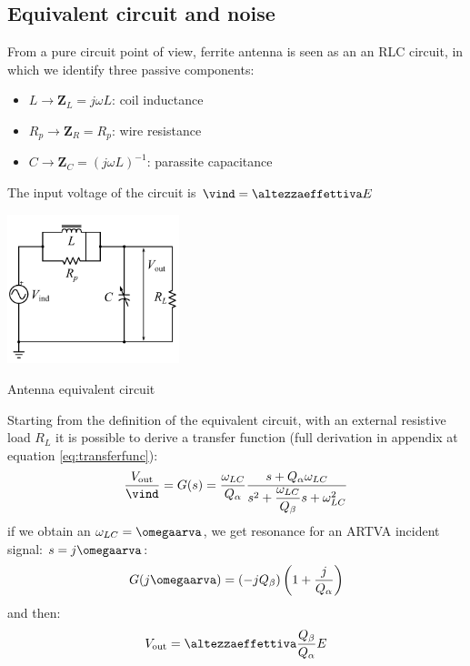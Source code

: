 \subsection{Equivalent circuit and noise}
From a pure circuit point of view, ferrite antenna is seen as an an RLC circuit, in which we identify three passive components:
\begin{itemize}
\item $L\rightarrow\mathbf{Z}_L = j\omega L$: coil inductance
\item $R_p\rightarrow\mathbf{Z}_R = R_p$: wire resistance
\item $C\rightarrow\mathbf{Z}_C = (j\omega L)^{-1}$: parassite capacitance
\end{itemize}
The input voltage of the circuit is $\vind=\altezzaeffettiva E$
\begin{marginfigure}
	\centering
	\includegraphics[width=5cm]{ch2/img/circuito_eq.pdf}
	\caption{Antenna equivalent circuit}
\end{marginfigure}

Starting from the definition of the equivalent circuit, with an external resistive load $R_L$ it is possible to derive a transfer function (full derivation in appendix at equation \ref{eq:transferfunc}):
\begin{equation}
\dfrac{V_{\mathrm{out}}}{\vind} = G(s) = \dfrac{\omega_{LC}}{Q_{\alpha}} \dfrac{s + Q_{\alpha} \omega_{LC}}{s^2 + \dfrac{\omega_{LC}}{Q_{\beta}} s + \omega_{LC}^2}
\end{equation}
if we obtain an ${\omega_{LC} = \omegaarva}$, we get resonance for an ARTVA incident signal: ${s=j\omegaarva}$:
\begin{equation}
G(j\omegaarva) = \left( -j Q_{\beta} \right) \left( 1 + \dfrac{j}{Q_{\alpha}} \right)
\end{equation} 
and then:
\begin{equation}
V_{\mathrm{out}} = \altezzaeffettiva \dfrac{Q_{\beta}}{Q_{\alpha}} E
\end{equation}

